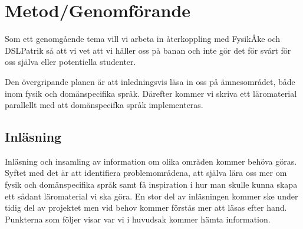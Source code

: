 \documentclass[12pt,a4paper]{article}
\begin{document}






\section{Metod/Genomförande}

Som ett genomgående tema vill vi arbeta in återkoppling med FysikÅke och DSLPatrik så att vi vet att vi håller oss på banan och inte gör det för svårt för oss själva eller potentiella studenter.

Den övergripande planen är att inledningsvis läsa in oss på ämnesområdet, både inom fysik och domänspecifika språk. Därefter kommer vi skriva ett läromaterial parallellt med att domänspecifka språk implementeras.

\subsection{Inläsning}

Inläsning och insamling av information om olika områden kommer behöva göras. Syftet med det är att identifiera problemområdena, att själva lära oss mer om fysik och domänspecifika språk samt få inspiration i hur man skulle kunna skapa ett sådant läromaterial vi ska göra. En stor del av inläsningen kommer ske under tidig del av projektet men vid behov kommer förstås mer att läsas efter hand. Punkterna som följer visar var vi i huvudsak kommer hämta information.
\end{document}
